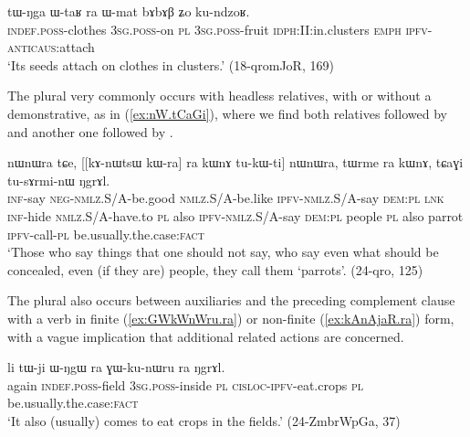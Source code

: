 \begin{exe}
\ex \label{ex:WtaR.ra.Wmat}
 \gll tɯ-ŋga ɯ-taʁ ra ɯ-mat bɤbɤβ ʑo ku-ndzoʁ. \\
 \textsc{indef}.\textsc{poss}-clothes \textsc{3sg}.\textsc{poss}-on \textsc{pl} \textsc{3sg}.\textsc{poss}-fruit \textsc{idph}:II:in.clusters \textsc{emph} \textsc{ipfv}-\textsc{anticaus}:attach \\
\glt `Its seeds attach on clothes in clusters.' (18-qromJoR, 169)
\end{exe}

The plural  very commonly occurs with headless relatives, with or without a demonstrative, as in (\ref{ex:nW.tCaGi}), where we find both relatives followed by  and another one followed by .

\begin{exe}
\ex \label{ex:nW.tCaGi}
\gll [kɤ-ti mɤ-kɯ-pe kɯ-fse tu-kɯ-ti] nɯnɯra tɕe, [[kɤ-nɯtsɯ kɯ-ra] ra kɯnɤ tu-kɯ-ti] nɯnɯra, 
tɯrme ra kɯnɤ, tɕaɣi tu-sɤrmi-nɯ ŋgrɤl.  \\
\textsc{inf}-say \textsc{neg}-\textsc{nmlz}.S/A-be.good \textsc{nmlz}.S/A-be.like \textsc{ipfv}-\textsc{nmlz}.S/A-say \textsc{dem}:\textsc{pl} \textsc{lnk} \textsc{inf}-hide \textsc{nmlz}.S/A-have.to \textsc{pl} also \textsc{ipfv}-\textsc{nmlz}.S/A-say \textsc{dem}:\textsc{pl} people \textsc{pl} also  parrot \textsc{ipfv}-call-\textsc{pl} be.usually.the.case:\textsc{fact} \\
\glt `Those who say things that one should not say, who say even what should be concealed, even (if they are) people, they call them `parrots'. (24-qro, 125)
\end{exe} 

 
The plural  also occurs between auxiliaries and the preceding complement clause with a verb in finite (\ref{ex:GWkWnWru.ra}) or non-finite (\ref{ex:kAnAjaR.ra}) form, with a vague implication that additional related actions are concerned.

\begin{exe}
\ex \label{ex:GWkWnWru.ra}
 \gll li tɯ-ji ɯ-ŋgɯ ra ɣɯ-ku-nɯru ra ŋgrɤl. \\
 again \textsc{indef}.\textsc{poss}-field \textsc{3sg}.\textsc{poss}-inside \textsc{pl} \textsc{cisloc}-\textsc{ipfv}-eat.crops \textsc{pl} be.usually.the.case:\textsc{fact} \\
\glt `It also (usually) comes to eat crops in the fields.' (24-ZmbrWpGa, 37)
\end{exe}

